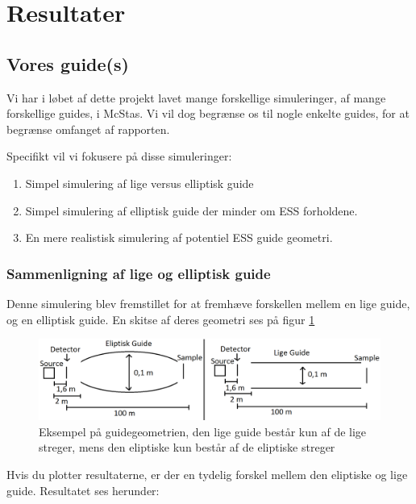 \documentclass[12pt,oneside,a4paper]{article}
\begin{document}
{{{{{\section{Resultater}

\subsection{Vores guide(s)}
Vi har i løbet af dette projekt lavet mange forskellige simuleringer, af mange forskellige guides, i McStas. Vi vil dog begrænse os til nogle enkelte guides, for at begrænse omfanget af rapporten.

Specifikt vil vi fokusere på disse simuleringer:
\begin{enumerate}
    \item Simpel simulering af lige versus elliptisk guide \cite{github:st_vs_el}
    \item Simpel simulering af elliptisk guide der minder om ESS forholdene. \cite{github:ess_sim_simple}
    \item En mere realistisk simulering af potentiel ESS guide geometri. \cite{github:ess_brill_optimized}
\end{enumerate}

\subsubsection{Sammenligning af lige og elliptisk guide}
Denne simulering blev fremstillet for at fremhæve forskellen mellem en lige guide, og en elliptisk guide. En skitse af deres geometri ses på figur \ref{lige_mod_eliptisk}

\begin{figure}[H] 
\centering
\includegraphics[width=1\textwidth]{Straight_VS_Elipse.png}
\caption{Eksempel på guidegeometrien, den lige guide består kun af de lige streger, mens den eliptiske kun består af de eliptiske streger} \label{lige_mod_eliptisk}
\end{figure}

Hvis du plotter resultaterne, er der en tydelig forskel mellem den eliptiske og lige guide. Resultatet ses herunder:

}}}}}
\end{document}
